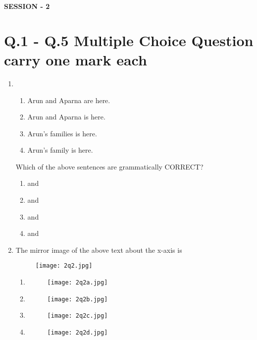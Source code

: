 \documentclass[journal,12pt,onecolumn]{article}
\theoremstyle{remark}
\begin{document}
\textbf{SESSION - 2}
\section*{Q.1 - Q.5 Multiple Choice Question carry one mark each}

\begin{enumerate}
\item 
\begin{enumerate}
    \item[\brak{i}] Arun and Aparna are here.
    \item[\brak{ii}] Arun and Aparna is here.
    \item[\brak{iii}] Arun's families is here.
    \item[\brak{iv}] Arun's family is here.
\end{enumerate}
Which of the above sentences are grammatically CORRECT?

\hfill{}

\begin{multicols}{2}
\begin{enumerate}
    \item {} and 
    \item {} and 
    \item {} and 
    \item {} and 
\end{enumerate}
\end{multicols}

\item The mirror image of the above text about the x-axis is
\begin{figure}[H]
    \centering
    \texttt{[image: 2q2.jpg]}
    \caption{}
    \label{fig:q2}
\end{figure}
\begin{multicols}{2}
\begin{enumerate}
    \item \begin{figure}[H]
    \centering
    \texttt{[image: 2q2a.jpg]}
    \caption{}
    \label{fig:q2}
\end{figure}
\item \begin{figure}[H]
    \centering
    \texttt{[image: 2q2b.jpg]}
    \caption{}
    \label{fig:q2}
\end{figure}
\item \begin{figure}[H]
    \centering
    \texttt{[image: 2q2c.jpg]}
    \caption{}
    \label{fig:q2}
\end{figure}
\item \begin{figure}[H]
    \centering
    \texttt{[image: 2q2d.jpg]}
    \caption{}
    \label{fig:q2}
\end{figure}
\end{enumerate}
\end{multicols}
\hfill{}




\end{enumerate}
\end{document}

